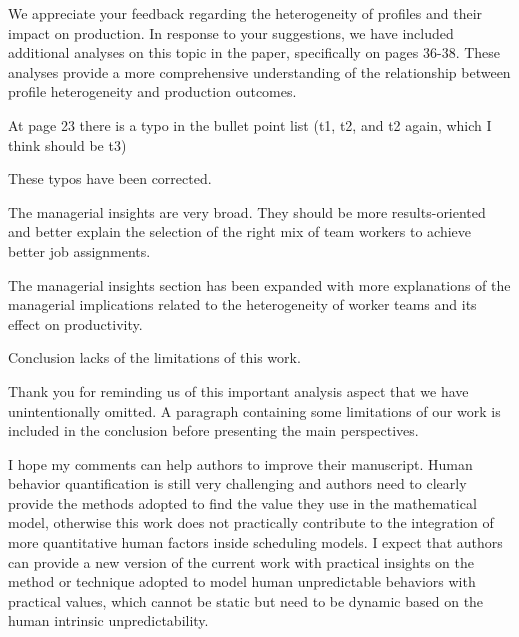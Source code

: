 \documentclass[preprint,11pt,3p]{elsarticle}
\begin{document}
\begin{tcolorbox}[colback=r_color1,colframe=r_color2,title=Response Q17:]
  We appreciate your feedback regarding the heterogeneity of profiles and their impact on production. In response to your suggestions, we have included additional analyses on this topic in the paper, specifically on pages 36-38. These analyses provide a more comprehensive understanding of the relationship between profile heterogeneity and production outcomes.
    
    
    
\end{tcolorbox}
\begin{tcolorbox}[colback=q_color1,colframe=q_color2,title=Q18:]	
	At page 23 there is a typo in the bullet point list (t1, t2, and t2 again, which I think should be t3)
\end{tcolorbox}


\begin{tcolorbox}[colback=r_color1,colframe=r_color2,title=Response Q18:]
	These typos have been corrected.
\end{tcolorbox}
\begin{tcolorbox}[colback=q_color1,colframe=q_color2,title=Q19:]	
	The managerial insights are very broad. They should be more results-oriented and better explain the selection of the right mix of team workers to achieve better job assignments.
\end{tcolorbox}


\begin{tcolorbox}[colback=r_color1,colframe=r_color2,title=Response Q19:]
The managerial insights section has been expanded with more explanations of the managerial implications related to the heterogeneity of worker teams and its effect on productivity.
\end{tcolorbox}
\begin{tcolorbox}[colback=q_color1,colframe=q_color2,title=Q20:]	
	Conclusion lacks of the limitations of this work.
\end{tcolorbox}


\begin{tcolorbox}[colback=r_color1,colframe=r_color2,title=Response Q20:]
  Thank you for reminding us of this important analysis aspect that we have unintentionally omitted. 
  A paragraph containing some limitations of our work is included in the conclusion before presenting the main perspectives.
\end{tcolorbox}
\begin{tcolorbox}[colback=q_color1,colframe=q_color2,title=Q21:]	
	I hope my comments can help authors to improve their manuscript. Human behavior quantification is still very challenging and authors need to clearly provide the methods adopted to find the value they use in the mathematical model, otherwise this work does not practically contribute to the integration of more quantitative human factors inside scheduling models. I expect that authors can provide a new version of the current work with practical insights on the method or technique adopted to model human unpredictable behaviors with practical values, which cannot be static but need to be dynamic based on the human intrinsic unpredictability.
\end{tcolorbox}
\end{document}
